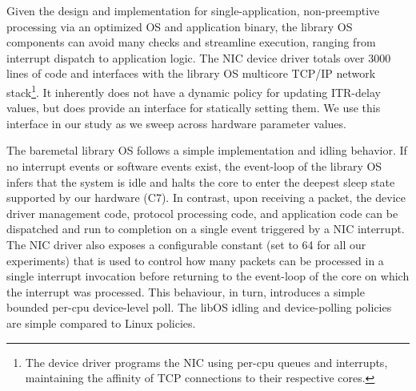 Given the design and implementation for single-application, non-preemptive processing via an optimized OS and application binary, the library OS components can avoid many checks and streamline execution, ranging from interrupt dispatch to application logic. The NIC device driver totals over 3000 lines of code and interfaces with the library OS multicore TCP/IP network stack\footnote{The device driver programs the NIC using per-cpu queues and interrupts, maintaining the affinity of TCP connections to their respective cores.}. It inherently does not have a dynamic policy for updating ITR-delay values, but does provide an interface for statically setting them. We use this interface in our study as we sweep across hardware parameter values. 

The baremetal library OS follows a simple implementation and idling behavior. If no interrupt events or software events exist, the event-loop of the library OS infers that the system is idle and halts the core to enter the deepest sleep state supported by our hardware (C7). In contrast, upon receiving a packet, the device driver management code, protocol processing code, and application code can be dispatched and run to completion on a single event triggered by a NIC interrupt. The NIC driver also exposes a configurable constant (set to 64 for all our experiments) that is used to control how many packets can be processed in a single interrupt invocation before returning to the event-loop of the core on which the interrupt was processed. This behaviour, in turn, introduces a simple bounded per-cpu device-level poll. The libOS idling and device-polling policies are simple compared to Linux policies. %


